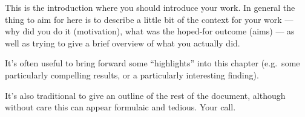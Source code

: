 This is the introduction where you should introduce your work.  In
general the thing to aim for here is to describe a little bit of the
context for your work --- why did you do it (motivation), what was the
hoped-for outcome (aims) --- as well as trying to give a brief
overview of what you actually did.

It's often useful to bring forward some ``highlights'' into 
this chapter (e.g.\ some particularly compelling results, or 
a particularly interesting finding). 

It's also traditional to give an outline of the rest of the
document, although without care this can appear formulaic 
and tedious. Your call. 
